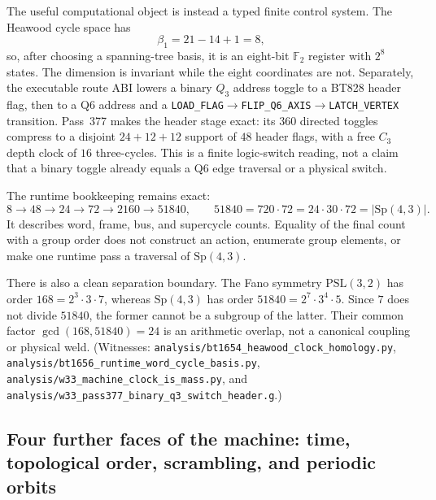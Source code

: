 \documentclass[11pt]{article}
\begin{document}
The useful computational object is instead a typed finite control system.
The Heawood cycle space has
\[
  \beta_1=21-14+1=8,
\]
so, after choosing a spanning-tree basis, it is an eight-bit
$\mathbb F_2$ register with $2^8$ states.  The dimension is invariant while
the eight coordinates are not.  Separately, the executable route ABI lowers
a binary $Q_3$ address toggle to a BT828 header flag, then to a Q6 address and
a \texttt{LOAD\_FLAG}$\to$\texttt{FLIP\_Q6\_AXIS}$\to$\texttt{LATCH\_VERTEX}
transition.  Pass~377 makes the header stage exact: its $360$ directed toggles
compress to a disjoint $24+12+12$ support of $48$ header flags, with a free
$C_3$ depth clock of $16$ three-cycles.  This is a finite logic-switch reading,
not a claim that a binary toggle already equals a Q6 edge traversal or a
physical switch.

The runtime bookkeeping remains exact:
\[
  8\to48\to24\to72\to2160\to51840,
  \qquad
  51840=720\cdot72=24\cdot30\cdot72=\lvert\mathrm{Sp}(4,3)\rvert.
\]
It describes word, frame, bus, and supercycle counts.  Equality of the final
count with a group order does not construct an action, enumerate group
elements, or make one runtime pass a traversal of $\mathrm{Sp}(4,3)$.

There is also a clean separation boundary.  The Fano symmetry
$\mathrm{PSL}(3,2)$ has order $168=2^3\cdot3\cdot7$, whereas
$\mathrm{Sp}(4,3)$ has order $51840=2^7\cdot3^4\cdot5$.  Since $7$ does not
divide $51840$, the former cannot be a subgroup of the latter.  Their common
factor $\gcd(168,51840)=24$ is an arithmetic overlap, not a canonical coupling
or physical weld.  (Witnesses: \texttt{analysis/bt1654\_heawood\_clock\_homology.py},
\texttt{analysis/bt1656\_runtime\_word\_cycle\_basis.py},
\texttt{analysis/w33\_machine\_clock\_is\_mass.py}, and
\texttt{analysis/w33\_pass377\_binary\_q3\_switch\_header.g}.)

\subsection{Four further faces of the machine: time, topological order,
scrambling, and periodic orbits}
\label{sec:four-faces}
\end{document}
